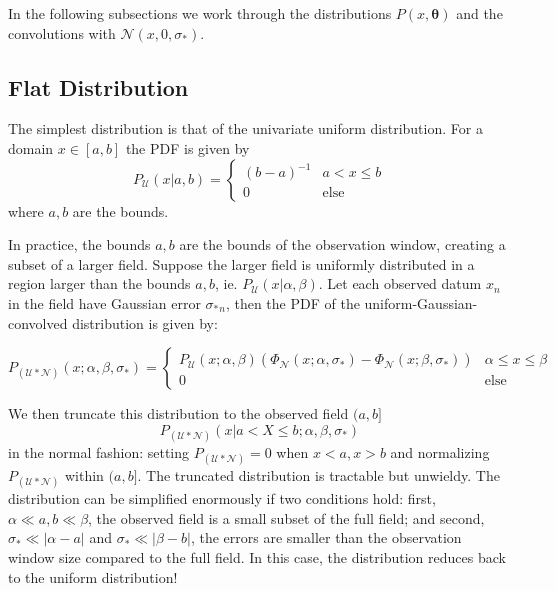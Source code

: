 \documentclass[twocolumn]{aastex631}
\newcommand{\mbs}[1]{\boldsymbol{#1}}
\newcommand{\mcal}[1]{\mathcal{#1}}
\newcommand{\pdf}{P}
\newcommand{\cdf}{\Phi}
\newcommand{\sigobs}{{\sigma_*}}
\begin{document}
    In the following subsections we work through the distributions $\pdf(x,\mbs{\theta})$ and the convolutions with $\mcal{N}(x,0,\sigobs)$.

    \vspace{5pt}
    \subsection{Flat Distribution} \label{sub:flat_distribution}

        The simplest distribution is that of the univariate uniform distribution.
        For a domain $x \in [a, b]$ the PDF is given by
        \begin{equation}\label{eq:pdf_flat_univariate}
            P_{\mcal{U}}(x|a,b) = \begin{cases}
                (b-a)^{-1} & a < x \leq b \\
                0 & \text{else}
            \end{cases}
        \end{equation}
        where $a,b$ are the bounds.

        In practice, the bounds $a,b$ are the bounds of the observation window, creating a subset of a larger field.
        Suppose the larger field is uniformly distributed in a region larger than the bounds $a, b$, ie. $P_{\mcal{U}}(x|\alpha,\beta)$.
        Let each observed datum $x_n$ in the field have Gaussian error $\sigobs_n$,
        then the PDF of the uniform-Gaussian-convolved distribution is given by:

        \begin{equation}
            \pdf_{(\mcal{U}*\mcal{N})}(x; \alpha, \beta, \sigobs) = \begin{cases}
                \pdf_\mcal{U}(x; \alpha, \beta) \left( \cdf_{\mcal{N}}(x; \alpha, \sigobs) - \cdf_{\mcal{N}}(x; \beta, \sigobs) \right) & \alpha \leq x \leq \beta \\
                0 & \text{else}
            \end{cases}
        \end{equation}

        We then truncate this distribution to the observed field $(a, b]$
        \begin{equation} \label{eq:pdf_flat_univariate_convolved_error_full}
            \pdf_{(\mcal{U}*\mcal{N})}(x | a < X \leq b; \alpha, \beta, \sigobs)
        \end{equation}
        in the normal fashion: setting $\pdf_{(\mcal{U}*\mcal{N})} = 0$ when $x < a, x > b$ and normalizing $\pdf_{(\mcal{U}*\mcal{N})}$ within $(a,b]$. The truncated distribution is tractable but unwieldy. The distribution can be simplified enormously if two conditions hold: first, $\alpha \ll a, b \ll \beta$, the observed field is a small subset of the full field; and second, 
        $\sigobs \ll |\alpha - a|$ and $\sigobs \ll |\beta - b|$, the errors are smaller than the observation window size compared to the full field.
        In this case, the distribution reduces back to the uniform distribution!
\end{document}
